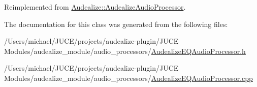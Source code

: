 Reimplemented from \hyperlink{class_audealize_1_1_audealize_audio_processor_af269ce5549d8474f11f26c41aefa51bc}{Audealize\+::\+Audealize\+Audio\+Processor}.



The documentation for this class was generated from the following files\+:\begin{DoxyCompactItemize}
\item 
/\+Users/michael/\+J\+U\+C\+E/projects/audealize-\/plugin/\+J\+U\+C\+E Modules/audealize\+\_\+module/audio\+\_\+processors/\hyperlink{_audealize_e_q_audio_processor_8h}{Audealize\+E\+Q\+Audio\+Processor.\+h}\item 
/\+Users/michael/\+J\+U\+C\+E/projects/audealize-\/plugin/\+J\+U\+C\+E Modules/audealize\+\_\+module/audio\+\_\+processors/\hyperlink{_audealize_e_q_audio_processor_8cpp}{Audealize\+E\+Q\+Audio\+Processor.\+cpp}\end{DoxyCompactItemize}
